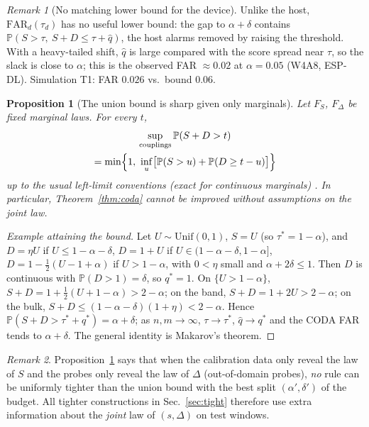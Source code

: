 \documentclass[conference]{IEEEtran}
\newtheorem{proposition}{Proposition}
\theoremstyle{definition}
\theoremstyle{remark}
\newtheorem{remark}{Remark}
\newcommand{\Prob}{\mathbb P}
\newcommand{\FAR}{\mathrm{FAR}}
\begin{document}
\begin{remark}[No matching lower bound for the device]
Unlike the host, $\FAR_d(\tau_d)$ has no useful lower bound: the gap to $\alpha+\delta$ contains $\Prob(S>\tau,\ S+D\le\tau+\hat q)$, the host alarms removed by raising the threshold. With a heavy-tailed shift, $\hat q$ is large compared with the score spread near $\tau$, so the slack is close to $\alpha$; this is the observed FAR $\approx 0.02$ at $\alpha=0.05$ (W4A8, ESP-DL). Simulation T1: FAR $0.026$ vs.\ bound $0.06$.
\end{remark}

\begin{proposition}[The union bound is sharp given only marginals]\label{prop:makarov}
Let $F_S$, $F_\Delta$ be fixed marginal laws. For every $t$,
\begin{multline*}\sup_{\text{couplings}}\Prob(S+D>t)\\=\min\Bigl\{1,\ \inf_{u}\bigl[\Prob(S>u)+\Prob(D\ge t-u)\bigr]\Bigr\}\end{multline*}
up to the usual left-limit conventions (exact for continuous marginals) \cite{makarov1981}. In particular, Theorem~\ref{thm:coda} cannot be improved without assumptions on the joint law.
\end{proposition}
\begin{proof}[Example attaining the bound]
Let $U\sim\mathrm{Unif}(0,1)$, $S=U$ (so $\tau^*=1-\alpha$), and $D=\eta U$ if $U\le1-\alpha-\delta$, $D=1+U$ if $U\in(1-\alpha-\delta,1-\alpha]$, $D=1-\tfrac12(U-1+\alpha)$ if $U>1-\alpha$, with $0<\eta$ small and $\alpha+2\delta\le1$. Then $D$ is continuous with $\Prob(D>1)=\delta$, so $q^*=1$. On $\{U>1-\alpha\}$, $S+D=1+\tfrac12(U+1-\alpha)>2-\alpha$; on the band, $S+D=1+2U>2-\alpha$; on the bulk, $S+D\le(1-\alpha-\delta)(1+\eta)<2-\alpha$. Hence $\Prob(S+D>\tau^*+q^*)=\alpha+\delta$; as $n,m\to\infty$, $\tau\to\tau^*$, $\hat q\to q^*$ and the CODA FAR tends to $\alpha+\delta$. The general identity is Makarov's theorem.
\end{proof}
\begin{remark}
Proposition~\ref{prop:makarov} says that when the calibration data only reveal the law of $S$ and the probes only reveal the law of $\Delta$ (out-of-domain probes), \emph{no} rule can be uniformly tighter than the union bound with the best split $(\alpha',\delta')$ of the budget. All tighter constructions in Sec.~\ref{sec:tight} therefore use extra information about the \emph{joint} law of $(s,\Delta)$ on test windows.
\end{remark}
\end{document}
